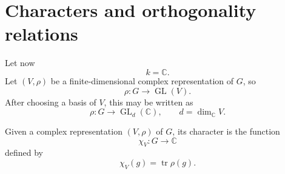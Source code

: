 \section{Characters and orthogonality relations}
Let now
\[
    k=\mathbb{C}.
\]
Let \((V,\rho)\) be a finite-dimensional complex representation of \(G\), so
\[
    \rho:G\longrightarrow \operatorname{GL}(V).
\]
After choosing a basis of \(V\), this may be written as
\[
    \rho:G\longrightarrow \operatorname{GL}_d(\mathbb{C}),
    \qquad
    d=\dim_{\mathbb{C}}V.
\]

\begin{definition}[Character]
    Given a complex representation \((V,\rho)\) of \(G\), its character is the
    function
    \[
        \chi_V:G\longrightarrow \mathbb{C}
    \]
    defined by
    \[
        \chi_V(g)=\operatorname{tr}\rho(g).
    \]
\end{definition}

